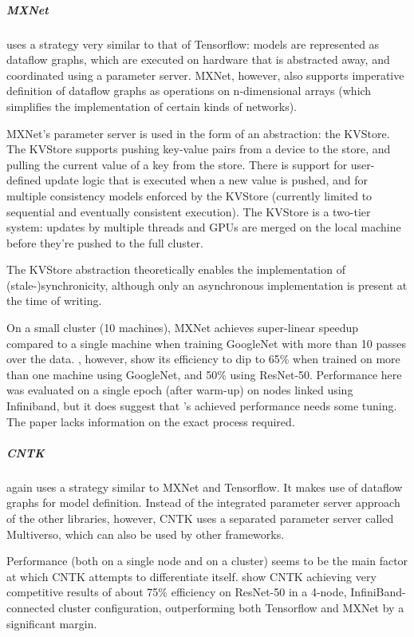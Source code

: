 \subparagraph{MXNet \citep{MXNet2015}}

uses a strategy very similar to that of Tensorflow: models are represented as dataflow graphs, which are executed on hardware that is abstracted away, and coordinated using a parameter server. MXNet, however, also supports imperative definition of dataflow graphs as operations on n-dimensional arrays (which simplifies the implementation of certain kinds of networks).

MXNet's parameter server is used in the form of an abstraction: the KVStore. The KVStore supports pushing key-value pairs from a device to the store, and pulling the current value of a key from the store. There is support for user-defined update logic that is executed when a new value is pushed, and for multiple consistency models enforced by the KVStore (currently limited to sequential and eventually consistent execution). The KVStore is a two-tier system: updates by multiple threads and GPUs are merged on the local machine before they're pushed to the full cluster.

The KVStore abstraction theoretically enables the implementation of (stale-)synchronicity, although only an asynchronous implementation is present at the time of writing. 

On a small cluster (10 machines), MXNet achieves super-linear speedup compared to a single machine when training GoogleNet\citep{Szegedy2014} with more than 10 passes over the data. \citet{Shaohuai2017}, however, show its efficiency to dip to 65\% when trained on more than one machine using GoogleNet\citep{Szegedy2014}, and 50\% using ResNet-50\citet{He2015}. Performance here was evaluated on a single epoch (after warm-up) on nodes linked using Infiniband, but it does suggest that \citet{MXNet2015}'s achieved performance needs some tuning. The paper lacks information on the exact process required.

\subparagraph{CNTK}

again uses a strategy similar to MXNet and Tensorflow. It makes use of dataflow graphs for model definition. Instead of the integrated parameter server approach of the other libraries, however, CNTK uses a separated parameter server called Multiverso, which can also be used by other frameworks.

Performance (both on a single node and on a cluster) seems to be the main factor at which CNTK attempts to differentiate itself. \citet{Shaohuai2017} show CNTK achieving very competitive results of about 75\% efficiency on ResNet-50\citep{He2015} in a 4-node, InfiniBand-connected cluster configuration, outperforming both Tensorflow and MXNet by a significant margin. 

